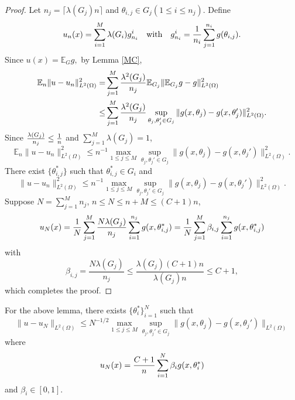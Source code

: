 \begin{proof}
Let $n_j=\lceil \lambda(G_j)n\rceil$ and $\theta_{i,j} \in G_j(1\leq i\leq n_j)$. Define 
$$
u_n(x)=\sum_{i=1}^M \lambda(G_i)g_{n_i}^i \quad \mbox{with}\quad g_{n_i}^i={1 \over n_i}\sum_{j=1}^{n_i} g(\theta_{i,j}).
$$
Since
$
u(x)=\mathbb{E}_G g,
$
by Lemma \ref{MC},
\begin{equation}
\begin{split}
\mathbb{E}_n\| u - u_n \|_{L^2(\Omega)}^2=& 
 \sum_{j=1}^{M}{\lambda^2(G_j) \over n_j}\mathbb{E}_{G_j}\|\mathbb{E}_{G_j} g -  g\|^2_{L^2(\Omega)}
\\
\le & \sum_{j=1}^{M} {\lambda^2(G_j)\over n_j}\sup_{\theta_{j},\theta_{j}'\in G_j} \| g(x,\theta_j) - g(x,\theta_j')\|^2_{L^2(\Omega)}.
\end{split}
\end{equation} 
Since ${\lambda(G_j)\over n_j}\le {1\over n}$ and $\displaystyle \sum_{j=1}^M \lambda(G_j)=1$,
\begin{equation}
\mathbb{E}_n\| u - u_n \|_{L^2(\Omega)}^2\leq n^{-1}\max_{1\le j\le M}\sup_{\theta_{j},\theta_{j}'\in G_j} \| g(x,\theta_j) - g(x,\theta_j')\|^2_{L^2(\Omega)}.
\end{equation}
There exist $\{\theta_{i,j}^\ast\}$ such that $\theta_{i,j}^\ast\in G_i$ and 
\begin{equation}
\| u -  u_n \|_{L^2(\Omega)}^2\leq n^{-1} \max_{1\le j\le M}\sup_{\theta_{j},\theta_{j}'\in G_j} \| g(x,\theta_j) - g(x,\theta_j')\|^2_{L^2(\Omega)}.
\end{equation}
Suppose $\displaystyle N=\sum_{j=1}^M n_j$, $n\le N\le n+M\le (C+1)n$,
$$
u_N(x) =  {1\over N}\sum_{j=1}^{M}\frac{N\lambda(G_j)}{n_j}\sum_{i=1}^{n_j} g(x,\theta_{i,j}^\ast)
 =  {1\over N}\sum_{j=1}^{M}\beta_{i,j}\sum_{i=1}^{n_j} g(x,\theta_{i,j}^\ast)
$$ 
with
\begin{equation}
\beta_{i,j}= \frac{N\lambda(G_j)}{n_j}\le \frac{\lambda(G_j)(C+1)n}{\lambda(G_j)n}\le C+1,
\end{equation}
which completes the proof. 
\end{proof}
\begin{remark}
For the above lemma, there exists $\{\theta_i^\ast\}_{i=1}^N$ such that
	\begin{equation} 
	\|u-u_N\|_{L^2(\Omega)} \leq N^{-1/2}\max_{1\le j\le M}\sup_{\theta_{j},\theta_{j}'\in G_j} \| g(x,\theta_j) - g(x,\theta_j')\|_{L^2(\Omega)} 
	\end{equation}
	where 
$$
	u_N(x)= {C+1\over n}\sum_{i=1}^N\beta_i g(x,\theta_i^\ast)
	$$ 
	and $\beta_i\in [0,1]$.
\end{remark}


